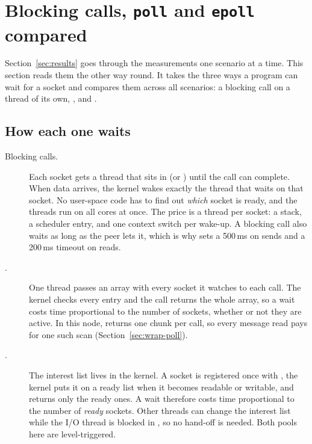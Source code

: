 \section{Blocking calls, \texttt{poll} and \texttt{epoll} compared}
\label{sec:compare}

Section~\ref{sec:results} goes through the measurements one scenario at a time. This
section reads them the other way round. It takes the three ways a program can wait
for a socket and compares them across all scenarios: a blocking call on a thread of
its own, , and .

\subsection{How each one waits}

\begin{description}
  \item[Blocking calls.] Each socket gets a thread that sits in  (or
        ) until the call can complete. When data arrives, the kernel
        wakes exactly the thread that waits on that socket. No user-space code has to
        find out \emph{which} socket is ready, and the threads run on all cores at
        once. The price is a thread per socket: a stack, a scheduler entry, and one
        context switch per wake-up. A blocking call also waits as long as the peer
        lets it, which is why  sets a 500\,ms  on
        sends and a 200\,ms timeout on reads.
  \item[.] One thread passes an array with every socket it watches to
        each call. The kernel checks every entry and the call returns the whole
        array, so a wait costs time proportional to the number of sockets, whether
        or not they are active. In this node,  returns one chunk
        per call, so every message read pays for one such scan
        (Section~\ref{sec:wrap-poll}).
  \item[.] The interest list lives in the kernel. A socket is registered
        once with , the kernel puts it on a ready list when it
        becomes readable or writable, and  returns only the ready
        ones. A wait therefore costs time proportional to the number of
        \emph{ready} sockets. Other threads can change the interest list while the
        I/O thread is blocked in , so no hand-off is needed. Both
        pools here are level-triggered.
\end{description}

